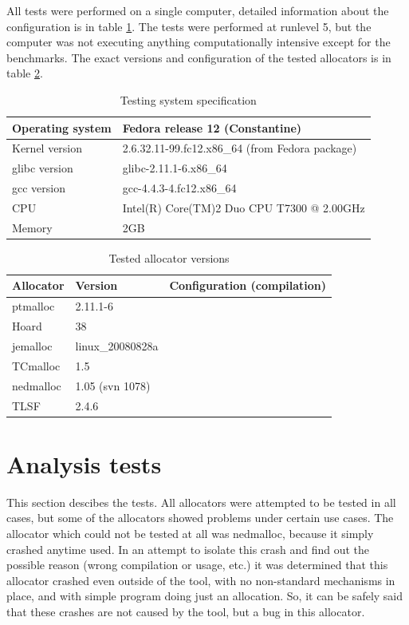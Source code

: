 All tests were performed on a single computer, detailed information about the configuration is in table \ref{systemspec}. The tests were performed at runlevel 5, but the computer was not executing anything computationally intensive except for the benchmarks. The exact versions and configuration of the tested allocators is in table \ref{allocversions}.

\begin{table}
\begin{center}
\begin{tabular}{|l|l|}
\hline
Operating system & Fedora release 12 (Constantine)\\ \hline
Kernel version & 2.6.32.11-99.fc12.x86\_64 (from Fedora package)\\ \hline
glibc version & glibc-2.11.1-6.x86\_64\\ \hline
gcc version & gcc-4.4.3-4.fc12.x86\_64\\ \hline
CPU & Intel(R) Core(TM)2 Duo CPU T7300  @ 2.00GHz\\ \hline
Memory & 2GB\\ \hline
\end{tabular}
\caption{Testing system specification}
\label{systemspec}
\end{center}
\end{table}

\begin{table}
\begin{center}
\begin{tabular}{|l|l|l|}
\hline
Allocator & Version & Configuration (compilation) \\ \hline \hline
ptmalloc & 2.11.1-6 &\\ \hline
Hoard & 38 &\\ \hline
jemalloc & linux\_20080828a &\\ \hline
TCmalloc & 1.5 & \\\hline
nedmalloc & 1.05 (svn 1078) & \\\hline
TLSF & 2.4.6 & \\\hline
\end{tabular}
\caption{Tested allocator versions}
\label{allocversions}
\end{center}
\end{table}

\section{Analysis tests}

This section descibes the tests. All allocators were attempted to be tested in all cases, but some of the allocators showed problems under certain use cases.
The allocator which could not be tested at all was nedmalloc, because it simply crashed anytime used. In an attempt to isolate this crash and find out the possible reason (wrong compilation or usage, etc.) it was determined that this allocator crashed even outside of the tool, with no non-standard mechanisms in place, and with simple program doing just an allocation. So, it can be safely said that these crashes are not caused by the tool, but a bug in this allocator.


